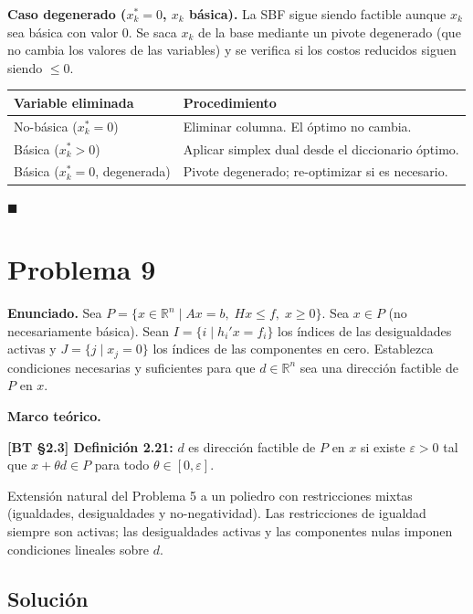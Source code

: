 \documentclass{article}
\newenvironment{marco}{\begin{mdframed}[linecolor=black!40,backgroundcolor=gray!5]\small\textbf{Marco teórico.}\par\smallskip}{\end{mdframed}\medskip}
\begin{document}
\textbf{Caso degenerado ($x_k^* = 0$, $x_k$ básica).} La SBF sigue siendo factible aunque $x_k$ sea básica con valor $0$. Se saca $x_k$ de la base mediante un pivote degenerado (que no cambia los valores de las variables) y se verifica si los costos reducidos siguen siendo $\leq 0$.

\medskip
\begin{center}
\begin{tabular}{|l|l|}
\hline
\textbf{Variable eliminada} & \textbf{Procedimiento} \\
\hline
No-básica ($x_k^* = 0$) & Eliminar columna. El óptimo no cambia. \\
\hline
Básica ($x_k^* > 0$) & Aplicar simplex dual desde el diccionario óptimo. \\
\hline
Básica ($x_k^* = 0$, degenerada) & Pivote degenerado; re-optimizar si es necesario. \\
\hline
\end{tabular}
\end{center}

$\blacksquare$

\section*{Problema 9}

\textbf{Enunciado.} Sea $P = \{x \in \mathbb{R}^n \mid Ax = b,\; Hx \leq f,\; x \geq 0\}$. Sea $x \in P$ (no necesariamente básica). Sean $I = \{i \mid h_i'x = f_i\}$ los índices de las desigualdades activas y $J = \{j \mid x_j = 0\}$ los índices de las componentes en cero. Establezca condiciones necesarias y suficientes para que $d \in \mathbb{R}^n$ sea una dirección factible de $P$ en $x$.

\begin{marco}
\textbf{[BT §2.3] Definición 2.21:} $d$ es dirección factible de $P$ en $x$ si existe $\varepsilon > 0$ tal que $x + \theta d \in P$ para todo $\theta \in [0,\varepsilon]$.

Extensión natural del Problema 5 a un poliedro con restricciones mixtas (igualdades, desigualdades y no-negatividad). Las restricciones de igualdad siempre son activas; las desigualdades activas y las componentes nulas imponen condiciones lineales sobre $d$.
\end{marco}

\subsection*{Solución}
\end{document}
